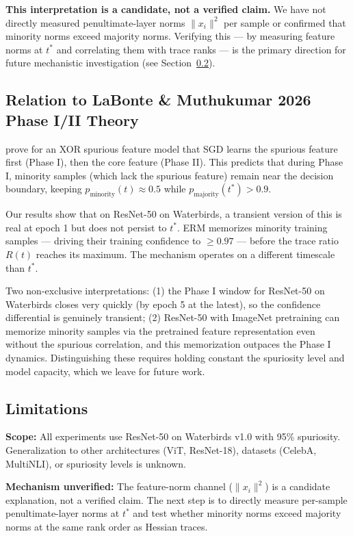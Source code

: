 \textbf{This interpretation is a candidate, not a verified claim.} We have not directly measured penultimate-layer norms $\|x_i\|^2$ per sample or confirmed that minority norms exceed majority norms. Verifying this --- by measuring feature norms at $t^*$ and correlating them with trace ranks --- is the primary direction for future mechanistic investigation (see Section~\ref{sec:limitations}).

\subsection{Relation to LaBonte \& Muthukumar 2026 Phase I/II Theory}

\cite{labonte2026phase} prove for an XOR spurious feature model that SGD learns the spurious feature first (Phase I), then the core feature (Phase II). This predicts that during Phase I, minority samples (which lack the spurious feature) remain near the decision boundary, keeping $p_{\text{minority}}(t)\approx 0.5$ while $p_{\text{majority}}(t^*)>0.9$.

Our results show that on ResNet-50 on Waterbirds, a transient version of this is real at epoch 1 but does not persist to $t^*$. ERM memorizes minority training samples --- driving their training confidence to $\geq 0.97$ --- before the trace ratio $R(t)$ reaches its maximum. The mechanism operates on a different timescale than $t^*$.

Two non-exclusive interpretations: (1) the Phase I window for ResNet-50 on Waterbirds closes very quickly (by epoch 5 at the latest), so the confidence differential is genuinely transient; (2) ResNet-50 with ImageNet pretraining can memorize minority samples via the pretrained feature representation even without the spurious correlation, and this memorization outpaces the Phase I dynamics. Distinguishing these requires holding constant the spuriosity level and model capacity, which we leave for future work.

\subsection{Limitations}
\label{sec:limitations}

\textbf{Scope:} All experiments use ResNet-50 on Waterbirds v1.0 with 95\% spuriosity. Generalization to other architectures (ViT, ResNet-18), datasets (CelebA, MultiNLI), or spuriosity levels is unknown.

\textbf{Mechanism unverified:} The feature-norm channel ($\|x_i\|^2$) is a candidate explanation, not a verified claim. The next step is to directly measure per-sample penultimate-layer norms at $t^*$ and test whether minority norms exceed majority norms at the same rank order as Hessian traces.


